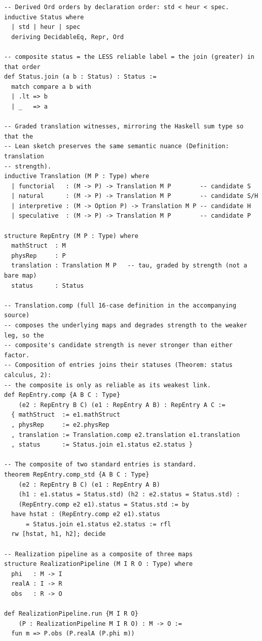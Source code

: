 \documentclass[12pt]{article}
\theoremstyle{definition}
\theoremstyle{remark}
\begin{document}
{\footnotesize
\begin{verbatim}
-- Derived Ord orders by declaration order: std < heur < spec.
inductive Status where
  | std | heur | spec
  deriving DecidableEq, Repr, Ord

-- composite status = the LESS reliable label = the join (greater) in that order
def Status.join (a b : Status) : Status :=
  match compare a b with
  | .lt => b
  | _   => a

-- Graded translation witnesses, mirroring the Haskell sum type so that the
-- Lean sketch preserves the same semantic nuance (Definition: translation
-- strength).
inductive Translation (M P : Type) where
  | functorial   : (M -> P) -> Translation M P        -- candidate S
  | natural      : (M -> P) -> Translation M P        -- candidate S/H
  | interpretive : (M -> Option P) -> Translation M P -- candidate H
  | speculative  : (M -> P) -> Translation M P        -- candidate P

structure RepEntry (M P : Type) where
  mathStruct  : M
  physRep     : P
  translation : Translation M P   -- tau, graded by strength (not a bare map)
  status      : Status

-- Translation.comp (full 16-case definition in the accompanying source)
-- composes the underlying maps and degrades strength to the weaker leg, so the
-- composite's candidate strength is never stronger than either factor.
-- Composition of entries joins their statuses (Theorem: status calculus, 2):
-- the composite is only as reliable as its weakest link.
def RepEntry.comp {A B C : Type}
    (e2 : RepEntry B C) (e1 : RepEntry A B) : RepEntry A C :=
  { mathStruct  := e1.mathStruct
  , physRep     := e2.physRep
  , translation := Translation.comp e2.translation e1.translation
  , status      := Status.join e1.status e2.status }

-- The composite of two standard entries is standard.
theorem RepEntry.comp_std {A B C : Type}
    (e2 : RepEntry B C) (e1 : RepEntry A B)
    (h1 : e1.status = Status.std) (h2 : e2.status = Status.std) :
    (RepEntry.comp e2 e1).status = Status.std := by
  have hstat : (RepEntry.comp e2 e1).status
      = Status.join e1.status e2.status := rfl
  rw [hstat, h1, h2]; decide

-- Realization pipeline as a composite of three maps
structure RealizationPipeline (M I R O : Type) where
  phi   : M -> I
  realA : I -> R
  obs   : R -> O

def RealizationPipeline.run {M I R O}
    (P : RealizationPipeline M I R O) : M -> O :=
  fun m => P.obs (P.realA (P.phi m))
\end{verbatim}
}
\end{document}
